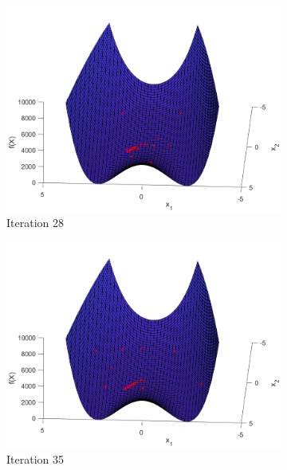 \begin{figure}
\begin{subfigure}[b]{0.4\textwidth}
    \includegraphics[width=\textwidth]{img/smpl/rosn2d-1-100/loa-iter-28}
    \caption{Iteration 28}
    \label{fig:s5-iter-4}
  \end{subfigure}
  \begin{subfigure}[b]{0.4\textwidth}
    \includegraphics[width=\textwidth]{img/smpl/rosn2d-1-100/loa-iter-35}
    \caption{Iteration 35}
    \label{fig:s5-iter-5}
  \end{subfigure}
  \begin{subfigure}[b]{0.4\textwidth}

\end{subfigure}
\end{figure}
